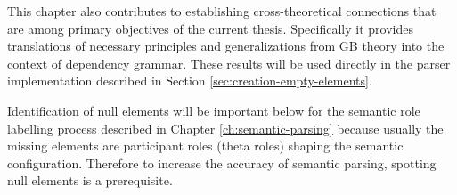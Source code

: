 This chapter also contributes to establishing cross-theoretical connections that are among primary objectives of the current thesis. Specifically it provides translations of necessary principles and generalizations from GB theory into the context of dependency grammar. These results will be used directly in the parser implementation described in Section \ref{sec:creation-empty-elements}.

Identification of null elements will be important below for the semantic role labelling process described in Chapter \ref{ch:semantic-parsing} because usually the missing elements are participant roles (theta roles) shaping the semantic configuration. Therefore to increase the accuracy of semantic parsing, spotting null elements is a prerequisite.
